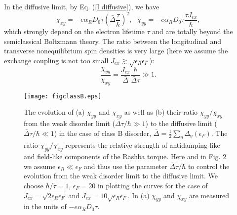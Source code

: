 \documentclass
[aps,pra,amsfonts,amssymb,twocolumn,amsmath,preprintnumbers,nofootinbib,floatfix,
showpacs,superscriptaddress]{revtex4-1}%
\begin{document}
In the diffusive limit, by Eq. (\ref{I diffusive}), we have%
\begin{equation}
\chi_{xy}=-e\alpha_{R}D_{0}\tau\left(  \bar{\Delta}\frac{\tau}{\hbar}\right)
^{2},\text{ }\chi_{yy}=-e\alpha_{R}D_{0}\tau\frac{\tau J_{ex}}{\hbar},
\label{SOT B diffusive}%
\end{equation}
which strongly depend on the electron lifetime $\tau$ and are totally beyond
the semiclassical Boltzmann theory. The ratio between the longitudinal and
transverse nonequilibrium spin densities is very large (here we assume the
exchange coupling is not too small $J_{ex}\gtrsim\sqrt{\epsilon_{R}%
\epsilon_{F}}$):
\begin{equation}
\frac{\chi_{yy}}{\chi_{xy}}=\frac{J_{ex}}{\bar{\Delta}}\frac{\hbar}%
{\bar{\Delta}\tau}\gg1.
\end{equation}
\begin{figure}[ptbh]
\texttt{[image: figclassB.eps]} \caption{The evolution
of (a) $\chi_{yy}$ and $\chi_{xy}$ as well as (b) their ratio $\chi_{yy}%
/\chi_{xy}$ from the weak disorder limit ($\bar{\Delta}\tau/\hbar\gg1$) to the
diffusive limit ($\bar{\Delta}\tau/\hbar\ll1$) in the case of class B
disorder, $\bar{\Delta}=\frac{1}{2}\sum_{\eta}\Delta_{\eta}\left(
\epsilon_{F}\right)  $. The ratio $\chi_{yy}/\chi_{xy}$ represents the
relative strength of antidamping-like and field-like components of the Rashba
torque. Here and in Fig. 2 we assume $\epsilon_{R}\ll\epsilon_{F}$ and thus
use the parameter $\bar{\Delta}\tau/\hbar$ to control the evolution from the
weak disorder limit to the diffusive limit. We choose $\hbar/\tau=1$,
$\epsilon_{F}=20$ in plotting the curves for the case of $J_{ex}%
=\sqrt{2\epsilon_{R}\epsilon_{F}}$ and $J_{ex}=10\sqrt{\epsilon_{R}%
\epsilon_{F}}$. In (a) $\chi_{yy}$ and $\chi_{xy}$ are measured in the units
of $-e\alpha_{R}D_{0}\tau$.}%
\label{fig1}%
\end{figure}
\end{document}
